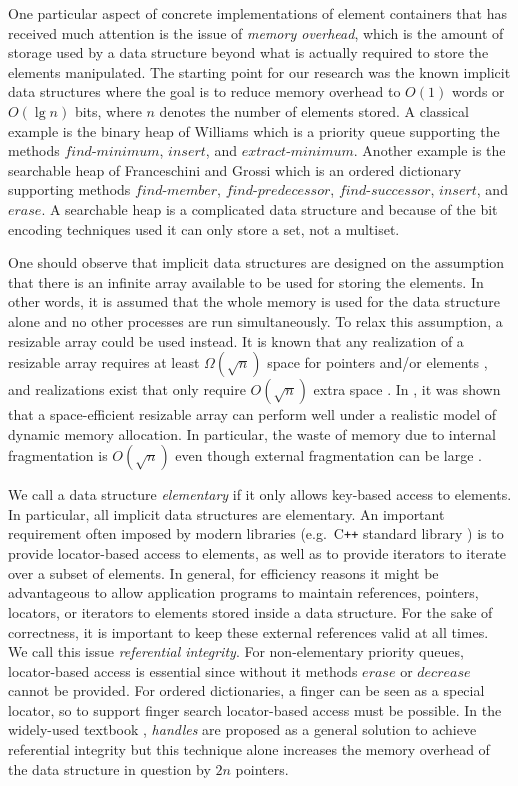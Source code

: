 \documentclass{DIKU-article}
\newcommand{\Erase}{\mbox{$\mathit{erase}$}}
\newcommand{\Findmin}{\mbox{$\mathit{find}$\textnormal{-}}\allowbreak{}\mbox{$\mathit{minimum}$}}
\newcommand{\Member}{\mbox{$\mathit{find}$\textnormal{-}}\allowbreak{}\mbox{$\mathit{member}$}}
\newcommand{\Predecessor}{\mbox{$\mathit{find}$\textnormal{-}}\allowbreak{}\mbox{$\mathit{predecessor}$}}
\newcommand{\Successor}{\mbox{$\mathit{find}$\textnormal{-}}\allowbreak{}\mbox{$\mathit{successor}$}}
\newcommand{\Insert}{\mbox{$\mathit{insert}$}}
\newcommand{\Extractmin}{\mbox{$\mathit{extract}$\textnormal{-}$\mathit{minimum}$}}
\newcommand{\Decrease}{\mbox{$\mathit{decrease}$}}
\begin{document}
One particular aspect of concrete implementations of element containers
that has received much attention is the issue of \emph{memory
overhead}, which is the amount of storage used by a data
structure beyond what is actually required to store the elements manipulated.
The starting point for our research was the known implicit data
structures where the goal is to reduce memory overhead to $O(1)$ words
or $O(\lg n)$ bits, where $n$ denotes the number of elements stored.  A
classical example is the binary heap of Williams \cite{Wil64} which is a
priority queue supporting the methods \Findmin{}, \Insert{}, and
\Extractmin{}. Another example is the searchable heap of Franceschini
and Grossi \cite{FG03} which is an ordered dictionary supporting
methods \Member{}, \Predecessor{}, \Successor{}, \Insert{}, and
\Erase{}. A searchable heap is a complicated data structure and
because of the bit encoding techniques used it can only store a set,
not a multiset.

One should observe that implicit data structures are
designed on the assumption that there is an infinite array available
to be used for storing the elements. In other words, it is assumed
that the whole memory is used for the data structure alone and no
other processes are run simultaneously. To relax this assumption,
a resizable array could be used instead.  It is known that any
realization of a resizable array requires at least $\Omega(\sqrt{n})$
space for pointers and/or elements \cite{BCDMS99}, and realizations
exist that only require $O(\sqrt{n})$ extra space \cite{BCDMS99,KM01}.
In \cite{BCDMS99}, it was shown that a space-efficient resizable array
can perform well under a realistic model of dynamic memory
allocation. In particular, the waste of memory due to internal
fragmentation is $O(\sqrt{n})$ even though external
fragmentation can be large \cite{LL85}.

We call a data structure \emph{elementary} if it only allows
key-based access to elements. In particular, all
implicit data structures are elementary.  An important requirement often
imposed by modern libraries (e.g.~C\texttt{++} standard library
\cite{ISO}) is to provide locator-based access to elements, as well as
to provide iterators to iterate over a subset of elements. In
general, for efficiency reasons it might be advantageous to allow
application programs to maintain references, pointers, locators, or iterators to
elements stored inside a data structure. For the sake of correctness,
it is important to keep these external references valid at all times. We call
this issue \emph{referential integrity}. For non-elementary priority queues,
locator-based access is essential since without it methods \Erase{}
or \Decrease{} cannot be provided. For ordered
dictionaries, a finger can be seen as a special locator, so to
support finger search locator-based access must be possible.  In the
widely-used textbook
\cite{CLRS01}, \emph{handles} are proposed as a general solution to
achieve referential integrity but this technique 
alone increases the memory overhead of the data structure in
question by $2n$ pointers.
\end{document}
